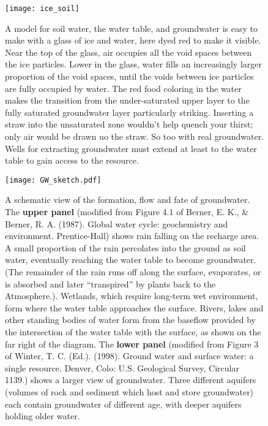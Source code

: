 \documentclass[amstex,12pt]{book}
\begin{document}
{\newpage
\begin{figure}[p]
\centering
  \texttt{[image: ice\_soil]}%
\caption{A model for soil water, the water table, and groundwater is easy to make with a glass of ice and water, here dyed red to make it visible. Near the top of the glass, air occupies all the void spaces between the ice particles. Lower in the glass, water fills an increasingly larger proportion of the void spaces, until the voids between ice particles are fully occupied by water. The red food coloring in the water makes the transition from the under-saturated upper layer to the fully saturated groundwater layer particularly striking. Inserting a straw into the unsaturated zone wouldn't help quench your thirst; only air would be drawn uo the straw. So too with real groundwater. Wells for extracting groundwater must extend at least to the water table to gain access to the resource. }
\label{fig:ice_soil}
\end{figure}

\newpage
\begin{figure}[p]
\centering
\texttt{[image: GW\_sketch.pdf]}%
\caption{A schematic view of the formation, flow and fate of groundwater. The \textbf{upper panel} (modified from Figure 4.1 of Berner, E. K., \& Berner, R. A. (1987). Global water cycle: geochemistry and environment. Prentice-Hall) shows rain falling on the recharge area. A small proportion of the rain percolates into the ground as soil water, eventually reaching the water table to become groundwater. (The remainder of the rain runs off along the surface, evaporates, or is absorbed and later ``transpired'' by plants back to the Atmosphere.). Wetlands, which require long-term wet environment, form where the water table approaches the surface. Rivers, lakes and other standing bodies of water form from the baseflow provided by the intersection of the water table with the surface, as shown on the far right of the diagram. The \textbf{lower panel} (modified from Figure 3 of Winter, T. C. (Ed.). (1998). Ground water and surface water: a single resource. Denver, Colo: U.S. Geological Survey, Circular 1139.) shows a larger view of groundwater. Three different aquifers (volumes of rock and sediment which host and store groundwater) each contain groundwater of different age, with deeper aquifers holding older water.}
\label{fig:gw_sketch}
\end{figure}

}
\end{document}
